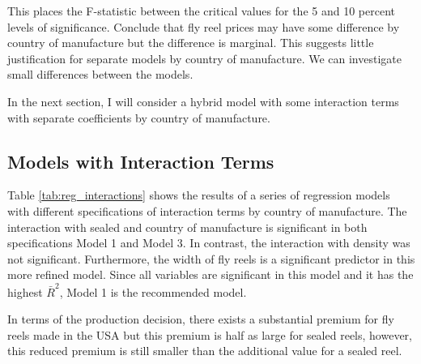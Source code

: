 This places the F-statistic between the critical values for the
5 and 10 percent levels of significance.
Conclude that fly reel prices may have some difference by
country of manufacture but the difference is marginal.
This suggests little justification for separate models by
country of manufacture.
We can investigate small differences between the models.


In the next section, 
I will consider a hybrid model with some interaction terms
with separate coefficients by country of manufacture. 


\pagebreak
\subsection{Models with Interaction Terms}

Table \ref{tab:reg_interactions} shows the results of 
a series of regression models with different 
specifications of interaction terms by country of manufacture. 
% 
The interaction with sealed and country of manufacture is significant in both specifications Model 1 and Model 3.
In contrast, the interaction with density was not significant. 
Furthermore, the width of fly reels is a significant predictor
in this more refined model. 
Since all variables are significant in this model and it
has the highest $\bar{R}^2$, Model 1 is the recommended model.





In terms of the production decision, 
there exists a substantial premium for fly reels made in the USA
but this premium is half as large for sealed reels, 
however, this reduced premium is still smaller than the 
additional value for a sealed reel.  


% 
